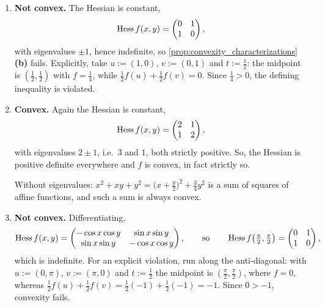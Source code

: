\begin{exercisesolution}
\label{sol:convex_or_not}
\begin{enumerate}[label=\textbf{(\alph*)}]
  \item \textbf{Not convex.} The Hessian is constant,
    \[\operatorname{Hess} f(x,y) = \begin{pmatrix} 0 & 1 \\ 1 & 0\end{pmatrix},\]
    with eigenvalues $\pm1$, hence indefinite, so
    \cref{prop:convexity_characterizations}\textbf{(b)} fails. Explicitly, take
    $u := (1,0)$, $v := (0,1)$ and $t := \tfrac12$: the midpoint is $(\tfrac12,\tfrac12)$ with
    $f = \tfrac14$, while $\tfrac12 f(u) + \tfrac12 f(v) = 0$. Since
    $\tfrac14 > 0$, the defining inequality is violated.
  \item \textbf{Convex.} Again the Hessian is constant,
    \[\operatorname{Hess} f(x,y) = \begin{pmatrix} 2 & 1 \\ 1 & 2\end{pmatrix},\]
    with eigenvalues $2 \pm 1$, i.e.\ $3$ and $1$, both strictly positive. So, the Hessian is
    positive definite everywhere and $f$ is convex, in fact strictly so.

    Without eigenvalues: $x^2+xy+y^2 = \big(x+\tfrac{y}{2}\big)^2 + \tfrac34 y^2$ is a sum of
    squares of affine functions, and such a sum is always convex.
  \item \textbf{Not convex.} Differentiating,
    \[\operatorname{Hess} f(x,y) = \begin{pmatrix} -\cos x\cos y & \sin x\sin y \\
      \sin x\sin y & -\cos x\cos y\end{pmatrix},
      \qquad\text{so}\qquad
      \operatorname{Hess} f\big(\tfrac{\pi}{2},\tfrac{\pi}{2}\big)
      = \begin{pmatrix}0&1\\1&0\end{pmatrix},\]
    which is indefinite. For an explicit violation, run along the anti-diagonal: with
    $u := (0,\pi)$, $v := (\pi,0)$ and $t := \tfrac12$ the midpoint is
    $(\tfrac{\pi}{2},\tfrac{\pi}{2})$, where $f = 0$, whereas
    $\tfrac12 f(u) + \tfrac12 f(v) = \tfrac12(-1) + \tfrac12(-1) = -1$. Since $0 > -1$, convexity
    fails.


\end{enumerate}
\end{exercisesolution}

